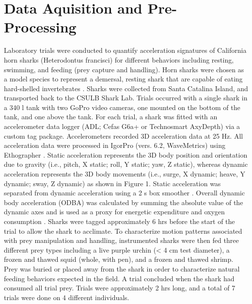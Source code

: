 \documentclass[conference]{IEEEtran}
\begin{document}
\section{Data Aquisition and Pre-Processing}
Laboratory trials were conducted to quantify acceleration signatures of California horn sharks (Heterodontus francisci) for different behaviors including resting, swimming, and feeding (prey capture and handling). Horn sharks were chosen as a model species to represent a demersal, resting shark that are capable of eating hard-shelled invertebrates \cite{8, 9, 10}. Sharks were collected from Santa Catalina Island, and transported back to the CSULB Shark Lab. Trials occurred with a single shark in a 340 l tank with two GoPro video cameras, one mounted on the bottom of the tank, and one above the tank. For each trial, a shark was fitted with an accelerometer data logger (ADL; Cefas G6a+ or Technosmart AxyDepth) via a custom tag package. Accelerometers recorded 3D acceleration data at 25 Hz. All acceleration data were processed in IgorPro (vers. 6.2, WaveMetrics) using Ethographer \cite{11}. Static acceleration represents the 3D body position and orientation due to gravity (i.e., pitch, X static; roll, Y static; yaw, Z static), whereas dynamic acceleration represents the 3D body movements (i.e., surge, X dynamic; heave, Y dynamic; sway, Z dynamic) as shown in Figure 1. Static acceleration was separated from dynamic acceleration using a 2 s box smoother \cite{12}. Overall dynamic body acceleration (ODBA) was calculated by summing the absolute value of the dynamic axes and is used as a proxy for energetic expenditure and oxygen consumption \cite{13}. Sharks were tagged approximately 6 hrs before the start of the trial to allow the shark to acclimate. To characterize motion patterns associated with prey manipulation and handling, instrumented sharks were then fed three different prey types including a live purple urchin (< 4 cm test diameter), a frozen and thawed squid (whole, with pen), and a frozen and thawed shrimp. Prey was buried or placed away from the shark in order to characterize natural feeding behaviors expected in the field. A trial concluded when the shark had consumed all trial prey. Trials were approximately 2 hrs long, and a total of 7 trials were done on 4 different individuals. 
\end{document}
